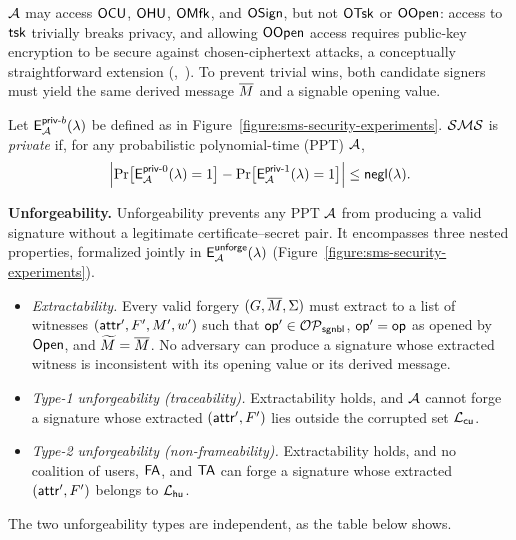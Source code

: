 $\mathcal{A}$ may access $\mathsf{OCU}$, $\mathsf{OHU}$, $\mathsf{OMfk}$, and $\mathsf{OSign}$,
but not $\mathsf{OTsk}$ or $\mathsf{OOpen}$:
access to $\mathsf{tsk}$ trivially breaks privacy,
and allowing $\mathsf{OOpen}$ access requires public-key encryption to be secure against chosen-ciphertext attacks,
a conceptually straightforward extension (\eg,~\cite{CRYPTO:NGSY22}).
To prevent trivial wins, both candidate signers must yield
the same derived message $\overline{M}$ and a signable opening value.

\begin{definition}[Privacy]\label{definition:sms-privacy}
Let $\mathsf{E}^{\mathsf{priv}\textsf{-}b}_{\mathcal{A}}(\lambda)$ be defined as in
Figure~\ref{figure:sms-security-experiments}.
$\mathcal{SMS}$ is \emph{private} if, for any probabilistic polynomial-time (PPT) $\mathcal{A}$,
\[
\left|\Pr\bigl[\mathsf{E}^{\mathsf{priv}\textsf{-}0}_{\mathcal{A}}(\lambda) = 1\bigr]
- \Pr\bigl[\mathsf{E}^{\mathsf{priv}\textsf{-}1}_{\mathcal{A}}(\lambda) = 1\bigr]\right|
\leq \mathsf{negl}(\lambda).
\]
\end{definition}



\medskip
\noindent\textbf{Unforgeability.}
Unforgeability prevents any PPT $\mathcal{A}$ from producing a valid \SMS signature
without a legitimate certificate--secret pair.
It encompasses three nested properties,
formalized jointly in $\mathsf{E}^{\mathsf{unforge}}_{\mathcal{A}}(\lambda)$
(Figure~\ref{figure:sms-security-experiments}).

\begin{itemize}
\item \emph{Extractability.}
Every valid forgery $(G, \overline{M}, \Sigma)$ must extract to a list of witnesses
$(\mathsf{attr}', F', M', w')$ such that
$\mathsf{op}' \in \mathcal{OP}_\mathsf{sgnbl}$,
$\mathsf{op}' = \mathsf{op}$ as opened by $\mathsf{Open}$,
and $\widetilde{M} = \overline{M}$.
No adversary can produce a signature whose extracted witness is inconsistent
with its opening value or its derived message.

\item \emph{Type-1 unforgeability (traceability).}
Extractability holds, and $\mathcal{A}$ cannot forge a signature
whose extracted $(\mathsf{attr}', F')$ lies outside the corrupted set $\mathcal{L}_\mathsf{cu}$.

\item \emph{Type-2 unforgeability (non-frameability).}
Extractability holds, and no coalition of users, $\mathsf{FA}$, and $\mathsf{TA}$
can forge a signature whose extracted $(\mathsf{attr}', F')$ belongs to $\mathcal{L}_\mathsf{hu}$.
\end{itemize}

The two unforgeability types are independent, as the table below shows.

